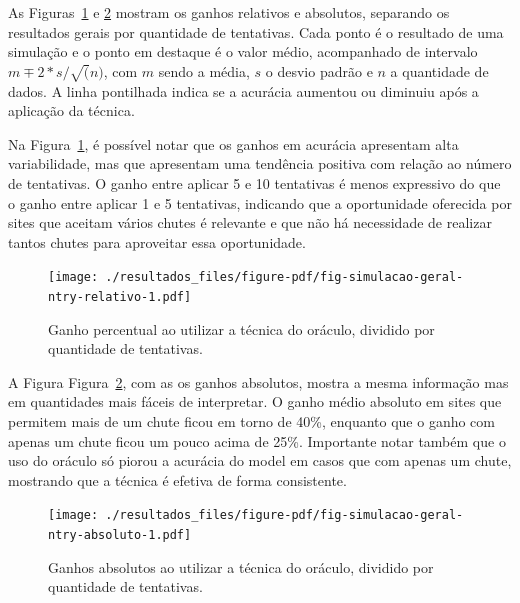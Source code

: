 \documentclass[12pt,twoside,brazilian]{book}
\begin{document}
As Figuras~\ref{fig-simulacao-geral-ntry-relativo} e
\ref{fig-simulacao-geral-ntry-absoluto} mostram os ganhos relativos e
absolutos, separando os resultados gerais por quantidade de tentativas.
Cada ponto é o resultado de uma simulação e o ponto em destaque é o
valor médio, acompanhado de intervalo \(m \mp 2*s/\sqrt(n)\), com \(m\)
sendo a média, \(s\) o desvio padrão e \(n\) a quantidade de dados. A
linha pontilhada indica se a acurácia aumentou ou diminuiu após a
aplicação da técnica.

Na Figura~\ref{fig-simulacao-geral-ntry-relativo}, é possível notar que
os ganhos em acurácia apresentam alta variabilidade, mas que apresentam
uma tendência positiva com relação ao número de tentativas. O ganho
entre aplicar 5 e 10 tentativas é menos expressivo do que o ganho entre
aplicar 1 e 5 tentativas, indicando que a oportunidade oferecida por
sites que aceitam vários chutes é relevante e que não há necessidade de
realizar tantos chutes para aproveitar essa oportunidade.

\begin{figure}

{\centering \texttt{[image: ./resultados\_files/figure-pdf/fig-simulacao-geral-ntry-relativo-1.pdf]}

}

\caption{\label{fig-simulacao-geral-ntry-relativo}Ganho percentual ao
utilizar a técnica do oráculo, dividido por quantidade de tentativas.}

\end{figure}

A Figura Figura~\ref{fig-simulacao-geral-ntry-absoluto}, com as os
ganhos absolutos, mostra a mesma informação mas em quantidades mais
fáceis de interpretar. O ganho médio absoluto em sites que permitem mais
de um chute ficou em torno de 40\%, enquanto que o ganho com apenas um
chute ficou um pouco acima de 25\%. Importante notar também que o uso do
oráculo só piorou a acurácia do model em casos que com apenas um chute,
mostrando que a técnica é efetiva de forma consistente.

\begin{figure}

{\centering \texttt{[image: ./resultados\_files/figure-pdf/fig-simulacao-geral-ntry-absoluto-1.pdf]}

}

\caption{\label{fig-simulacao-geral-ntry-absoluto}Ganhos absolutos ao
utilizar a técnica do oráculo, dividido por quantidade de tentativas.}

\end{figure}
\end{document}
